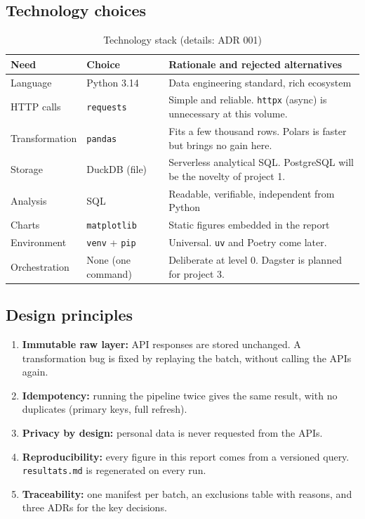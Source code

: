 \documentclass[11pt, a4paper, oneside, headings=normal, numbers=noenddot, DIV=12]{scrartcl}
\begin{document}
\subsection{Technology choices}
\begin{table}[H]
\centering\small
\begin{tabularx}{\linewidth}{@{}L{2.5cm} L{3.4cm} Y@{}}
\toprule
\textbf{Need} & \textbf{Choice} & \textbf{Rationale and rejected alternatives} \\
\midrule
Language & Python 3.14 & Data engineering standard, rich ecosystem \\
HTTP calls & \texttt{requests} & Simple and reliable. \texttt{httpx} (async) is unnecessary at this volume. \\
Transformation & \texttt{pandas} & Fits a few thousand rows. Polars is faster but brings no gain here. \\
Storage & DuckDB (file) & Serverless analytical SQL. PostgreSQL will be the novelty of project 1. \\
Analysis & SQL & Readable, verifiable, independent from Python \\
Charts & \texttt{matplotlib} & Static figures embedded in the report \\
Environment & \texttt{venv} + \texttt{pip} & Universal. \texttt{uv} and Poetry come later. \\
Orchestration & None (one command) & Deliberate at level 0. Dagster is planned for project 3. \\
\bottomrule
\end{tabularx}
\caption{Technology stack (details: ADR 001)}
\end{table}

\subsection{Design principles}
\begin{enumerate}[leftmargin=1.4em]
  \item \textbf{Immutable raw layer:} API responses are stored unchanged. A transformation bug is fixed by replaying the batch,
        without calling the APIs again.
  \item \textbf{Idempotency:} running the pipeline twice gives the same result, with no duplicates (primary keys, full refresh).
  \item \textbf{Privacy by design:} personal data is never requested from the APIs.
  \item \textbf{Reproducibility:} every figure in this report comes from a versioned query. \texttt{resultats.md} is regenerated on every run.
  \item \textbf{Traceability:} one manifest per batch, an exclusions table with reasons, and three ADRs for the key decisions.
\end{enumerate}
\end{document}
